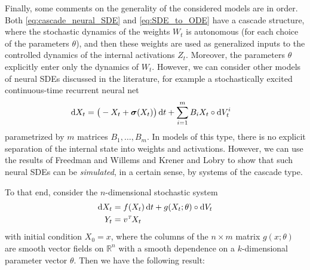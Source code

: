 \documentclass[letterpaper, 10pt, conference]{ieeeconf}
\def\Reals{{\mathbb R}}
\def\trn{{\hbox{\it\tiny T}}} %
\begin{document}
Finally, some comments on the generality of the considered models are in order. Both \eqref{eq:cascade_neural_SDE} and \eqref{eq:SDE_to_ODE} have a cascade structure, where the stochastic dynamics of the weights $W_t$ is autonomous (for each choice of the parameters $\theta$), and then these weights are used as generalized inputs \cite{Sussmann_geninputs} to the controlled dynamics of the internal activations $Z_t$. Moreover, the parameters $\theta$ explicitly enter only the dynamics of $W_t$. However, we can consider other models of neural SDEs discussed in the literature, for example a stochastically excited continuous-time recurrent neural net
\begin{align*}
	\dif X_t &= \big(- X_t + \boldsymbol{\sigma}(X_t)\big)\dif t + \sum^m_{i=1} B_i X_t \circ \dif V^i_t
\end{align*}
parametrized by $m$ matrices $B_1,\dots,B_m$. In models of this type, there is no explicit separation of the internal state into weights and activations. However, we can use the results of Freedman and Willems \cite{freedman1978smooth} and Krener and Lobry \cite{krener1981complexity} to show that such neural SDEs  can be \textit{simulated}, in a certain sense, by systems of the cascade type.

To that end, consider the $n$-dimensional stochastic system\begin{subequations}\label{eq:general_neural_SDE}
\begin{align}
	\dif X_t &= f(X_t)\dif t + g(X_t; \theta) \circ \dif V_t \\
	Y_t &= v^\trn X_t
\end{align}
\end{subequations}
with initial condition $X_0 = x$, where the columns of the $n \times m$ matrix $g(x;\theta)$ are smooth vector fields on $\Reals^n$ with a smooth dependence on a $k$-dimensional parameter vector $\theta$. Then we have the following result:
\end{document}

